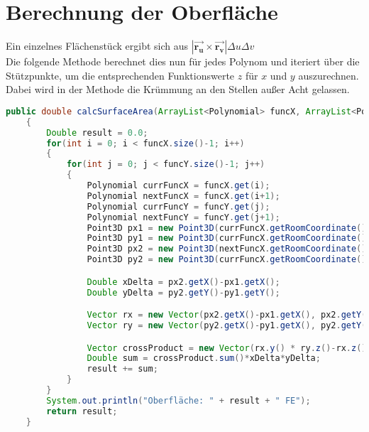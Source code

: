 \documentclass[11pt, bibliography=totocnumbered]{scrartcl}
\begin{document}
\section{Berechnung der Oberfl\"ache}
Ein einzelnes Fl\"achenst\"uck ergibt sich aus $|\overrightarrow{\boldsymbol{r_u}} \times \overrightarrow{\boldsymbol{r_v}}| \Delta u \Delta v$ \\
Die folgende Methode berechnet dies nun f\"ur jedes Polynom und iteriert \"uber die St\"utzpunkte, um die entsprechenden Funktionswerte $z$ f\"ur $x$ und $y$ auszurechnen. Dabei wird in der Methode die Kr\"ummung an den Stellen au{\ss}er Acht gelassen. \newpage
\begin{lstlisting}[caption={}, label={lst:label}, language=Java]
    public double calcSurfaceArea(ArrayList<Polynomial> funcX, ArrayList<Polynomial> funcY)
    {
        Double result = 0.0;
        for(int i = 0; i < funcX.size()-1; i++)
        {
            for(int j = 0; j < funcY.size()-1; j++)
            {
                Polynomial currFuncX = funcX.get(i);
                Polynomial nextFuncX = funcX.get(i+1);
                Polynomial currFuncY = funcY.get(j);
                Polynomial nextFuncY = funcY.get(j+1);
                Point3D px1 = new Point3D(currFuncX.getRoomCoordinate(), currFuncY.getRoomCoordinate(), currFuncX.derivation(currFuncY.getRoomCoordinate()));
                Point3D py1 = new Point3D(currFuncX.getRoomCoordinate(), currFuncY.getRoomCoordinate(), currFuncY.derivation(currFuncX.getRoomCoordinate()));
                Point3D px2 = new Point3D(nextFuncX.getRoomCoordinate(), currFuncY.getRoomCoordinate(), nextFuncX.derivation(currFuncY.getRoomCoordinate()));
                Point3D py2 = new Point3D(currFuncX.getRoomCoordinate(), nextFuncY.getRoomCoordinate(), nextFuncY.derivation(currFuncX.getRoomCoordinate()));

                Double xDelta = px2.getX()-px1.getX();
                Double yDelta = py2.getY()-py1.getY();

                Vector rx = new Vector(px2.getX()-px1.getX(), px2.getY()-px1.getY(), px2.getZ()-px1.getZ());
                Vector ry = new Vector(py2.getX()-py1.getX(), py2.getY()-py1.getY(), py2.getZ()-py1.getZ());

                Vector crossProduct = new Vector(rx.y() * ry.z()-rx.z()*ry.y(),rx.z()*ry.x()-rx.x()*ry.z(), rx.x()*ry.y()-rx.y()*ry.x());
                Double sum = crossProduct.sum()*xDelta*yDelta;
                result += sum;
            }
        }
        System.out.println("Oberfläche: " + result + " FE");
        return result;
    }
\end{lstlisting}
\end{document}
